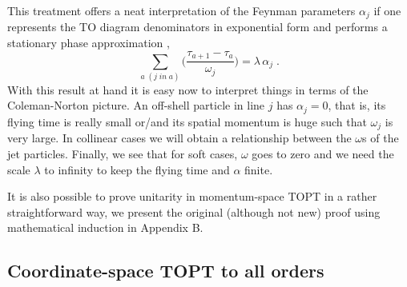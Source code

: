 \documentclass[%
 reprint,
 amsmath,amssymb,
 aps,
]{revtex4-1}
\begin{document}
This treatment offers a neat interpretation of the Feynman parameters $\alpha_j$  if one represents the TO diagram denominators in exponential form and performs a stationary phase approximation \cite{Stermannotes},
\begin{equation}
\sum_{a\;(j\;in\; a)}\Big(\frac{\tau_{a+1}-\tau_a}{\omega_j}\Big)=\lambda\,\alpha_j\;.
\end{equation}
With this result at hand it is easy now to interpret things in terms of the Coleman-Norton picture. An off-shell particle in line $j$ has $\alpha_j=0$, that is,  its flying time is really small or/and its spatial momentum is huge such that $\omega_j$ is very large. In collinear cases we will obtain a relationship between the $\omega$s of the jet particles. Finally, we see that for soft cases, $\omega$ goes to zero and we need the scale $\lambda$ to infinity to keep the flying time and $\alpha$ finite. \par
It is also possible to prove unitarity in momentum-space TOPT in a rather straightforward way, we present the original (although not new) proof using mathematical induction in Appendix B.

\subsection{Coordinate-space TOPT to all orders}
\end{document}
